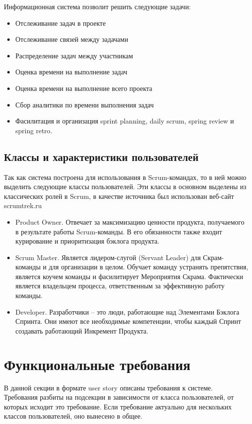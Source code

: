 \documentclass[14pt,a4paper]{extarticle}
\begin{document}
Информационная система позволит решить следующие задачи:
\begin{itemize}
	\item Отслеживание задач в проекте
	\item Отслеживание связей между задачами
	\item Распределение задач между участникам
	\item Оценка времени на выполнение задач
	\item Оценка времени на выполнение всего проекта
	\item Сбор аналитики по времени выполнения задач
	\item Фасилитация и организация sprint planning, daily scrum, spring review и spring retro.
\end{itemize}

\subsection{Классы и характеристики пользователей}
Так как система построена для использования в Scrum-командах, то в ней
можно выделить следующие классы пользователей. Эти классы в основном выделены из
классических ролей в Scrum, в качестве источника был использован веб-сайт scrumtrek.ru
\begin{itemize}
	\item Product Owner. Отвечает за максимизацию ценности продукта, получаемого в результате работы Scrum-команды.
	      В его обязанности также входит курирование и приоритизация бэклога продукта.
	\item Scrum Master. Является лидером-слугой (Servant Leader) для Скрам-команды и для организации в целом.
	      Обучает команду устранять препятствия, является коучем команды и фасилитирует Мероприятия Скрама.
	      Фактически является владельцем процесса, ответственным за эффективную работу команды.
	\item Developer. Разработчики -- это люди, работающие над Элементами Бэклога Спринта.
	      Они имеют все необходимые компетенции, чтобы каждый Спринт создавать работающий Инкремент Продукта.
\end{itemize}

\section{Функциональные требования}

В данной секции в формате user story описаны требования к системе.
Требования разбиты на подсекции в зависимости от класса пользователей,
от которых исходит это требование.
Если требование актуально для нескольких классов пользователей, оно
вынесено в общее.
\end{document}
